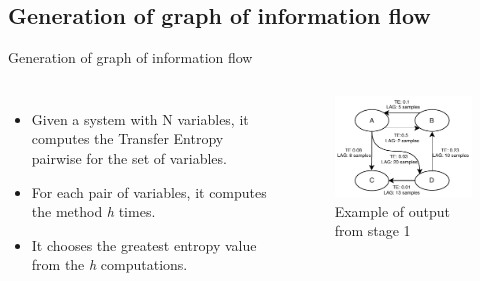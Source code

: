 \subsection{Generation of graph of information flow}
\begin{frame}{Generation of graph of information flow}
    \begin{columns}
            \begin{itemize}
                \item{Given a system with N variables, it computes the Transfer Entropy pairwise for the set of variables.}

                \item{For each pair of variables, it computes the method \textit{h} times.}
                
                \item{It chooses the greatest entropy value from the \textit{h} computations.}
            \end{itemize}
            \begin{figure}
                \includegraphics[width=\textwidth]{figuras/graphExample.pdf}
                \caption{Example of output from stage 1}
            \end{figure}          
    \end{columns}    

\end{frame}


